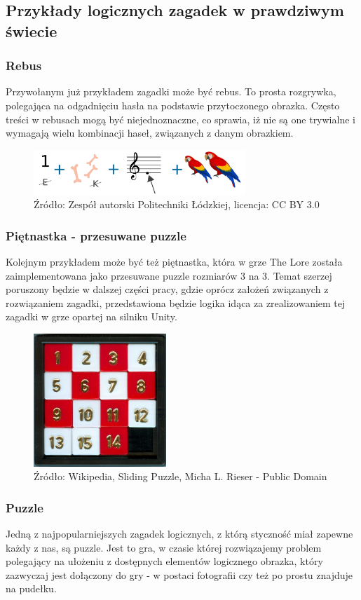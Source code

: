 \documentclass[oneside,polski,logo]{amuthesis}
\begin{document}
\subsection{Przykłady logicznych zagadek w prawdziwym świecie}
\subsubsection{Rebus}
Przywołanym już przykładem zagadki może być rebus. To prosta rozgrywka, polegająca na odgadnięciu hasła na podstawie przytoczonego obrazka. Często treści w rebusach mogą być niejednoznaczne, co sprawia, iż nie są one trywialne i wymagają wielu kombinacji haseł, związanych z danym obrazkiem. \cite{rebus}
\begin{figure}[h]
	\centering
	\includegraphics[width=8cm]{images/tyrek/rebus.png}
	\caption{Źródło: Zespół autorski Politechniki Łódzkiej, licencja: CC BY 3.0}
\end{figure}

\subsubsection{Piętnastka - przesuwane puzzle}
Kolejnym przykładem może być też piętnastka, która w grze The Lore została zaimplementowana jako przesuwane puzzle rozmiarów 3 na 3. Temat szerzej poruszony będzie w dalszej części pracy, gdzie oprócz założeń związanych z rozwiązaniem zagadki, przedstawiona będzie logika idąca za zrealizowaniem tej zagadki w grze opartej na silniku Unity. 
\begin{figure}[h]
	\centering
	\includegraphics[width=5cm]{images/tyrek/przesuwane-puzzle.jpg}
	\caption{Źródło: Wikipedia, Sliding Puzzle, Micha L. Rieser - Public Domain}
\end{figure}

\subsubsection{Puzzle}
Jedną z najpopularniejszych zagadek logicznych, z którą styczność miał zapewne każdy z nas, są puzzle. Jest to gra, w czasie której rozwiązajemy problem polegający na ułożeniu z dostępnych elementów logicznego obrazka, który zazwyczaj jest dołączony do gry - w postaci fotografii czy też po prostu znajduje na pudełku.   
 
\end{document}
